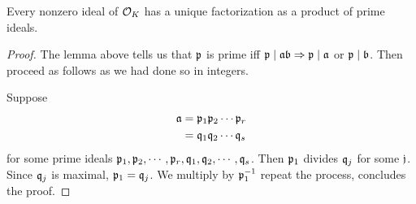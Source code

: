 \begin{theorem}
    Every nonzero ideal of $\mathcal{O}_K$ has a unique factorization as a product of prime ideals.
\end{theorem}
\begin{proof}
    The lemma above tells us that $\mathfrak{p}$ is prime iff $\mathfrak{p}\mid \mathfrak{a}\mathfrak{b} \Rightarrow \mathfrak{p}\mid\mathfrak{a}$ or $\mathfrak{p}\mid\mathfrak{b}$. Then proceed as follows as we had done so in integers.

    Suppose
    \begin{align*}
        \mathfrak{a} & = \mathfrak{p}_1\mathfrak{p}_2\cdots \mathfrak{p}_r \\
                & = \mathfrak{q}_1\mathfrak{q}_2\cdots \mathfrak{q}_s
    \end{align*}
    for some prime ideals $\mathfrak{p}_1, \mathfrak{p}_2, \cdots,  \mathfrak{p}_r, \mathfrak{q}_1, \mathfrak{q}_2, \cdots, \mathfrak{q}_s$. Then $\mathfrak{p}_1$ divides $\mathfrak{q}_j$ for some $\mathfrak{j}$. Since $\mathfrak{q}_j$ is maximal, $\mathfrak{p}_1 = \mathfrak{q}_j$. We multiply by $\mathfrak{p}_1^{-1}$ repeat the process, concludes the proof.
\end{proof}